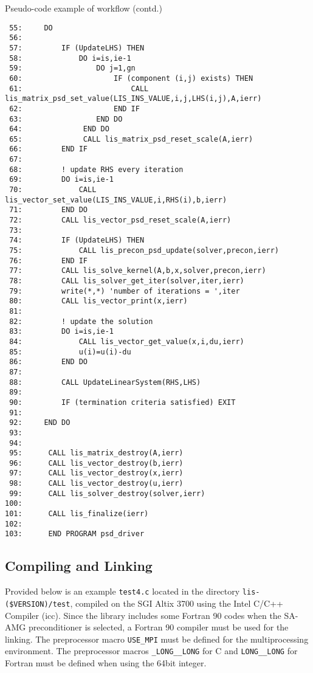 \documentclass[a4paper]{article}
\begin{document}
\begin{itemsquarebox}[l]{Pseudo-code example of workflow (contd.)}
{\small
\begin{verbatim}
 55:     DO
 56:
 57:         IF (UpdateLHS) THEN
 58:             DO i=is,ie-1
 59:                 DO j=1,gn
 60:                     IF (component (i,j) exists) THEN
 61:                         CALL lis_matrix_psd_set_value(LIS_INS_VALUE,i,j,LHS(i,j),A,ierr)
 62:                     END IF
 63:                 END DO
 64:              END DO
 65:              CALL lis_matrix_psd_reset_scale(A,ierr)
 66:         END IF
 67:
 68:         ! update RHS every iteration
 69:         DO i=is,ie-1
 70:             CALL lis_vector_set_value(LIS_INS_VALUE,i,RHS(i),b,ierr)
 71:         END DO
 72:         CALL lis_vector_psd_reset_scale(A,ierr)
 73:
 74:         IF (UpdateLHS) THEN
 75:             CALL lis_precon_psd_update(solver,precon,ierr)
 76:         END IF
 77:         CALL lis_solve_kernel(A,b,x,solver,precon,ierr)
 78:         CALL lis_solver_get_iter(solver,iter,ierr)
 79:         write(*,*) 'number of iterations = ',iter
 80:         CALL lis_vector_print(x,ierr)
 81:
 82:         ! update the solution
 83:         DO i=is,ie-1
 84:             CALL lis_vector_get_value(x,i,du,ierr)
 85:             u(i)=u(i)-du
 86:         END DO
 87:
 88:         CALL UpdateLinearSystem(RHS,LHS)
 89:
 90:         IF (termination criteria satisfied) EXIT
 91:
 92:     END DO
 93:
 94:
 95:      CALL lis_matrix_destroy(A,ierr)
 96:      CALL lis_vector_destroy(b,ierr)
 97:      CALL lis_vector_destroy(x,ierr)
 98:      CALL lis_vector_destroy(u,ierr)
 99:      CALL lis_solver_destroy(solver,ierr)
100:
101:      CALL lis_finalize(ierr)
102:
103:      END PROGRAM psd_driver
\end{verbatim}
}
\end{itemsquarebox}

\newpage
\subsection{Compiling and Linking}
Provided below is an example {\tt test4.c} located in
the directory \verb|lis-($VERSION)/test|, 
compiled on the SGI Altix 3700 using the Intel C/C++ Compiler (icc). 
Since the library includes some Fortran 90 codes 
when the SA-AMG preconditioner is selected, 
a Fortran 90 compiler must be used for the linking. 
The preprocessor macro \verb|USE_MPI| must be defined for the
multiprocessing environment. 
The preprocessor macros {\tt \_LONG\_\_LONG} for C and {\tt LONG\_\_LONG} 
for Fortran must be defined when using the 64bit integer.
\end{document}
